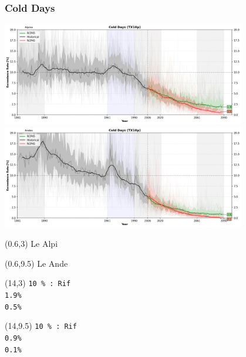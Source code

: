 \begin{frame}
\frametitle{Cold Days}
\begin{center}

{\includegraphics[width=0.8\textwidth]{risultati/tx10p_Alpine_Models_ts_lim_20}}
{\includegraphics[width=0.8\textwidth]{risultati/tx10p_Andes_Models_ts_lim_20}}
\end{center}

{
  \scriptsize
  \begin{textblock}{1.8}(0.6,3)
     {\color{gray} Le Alpi}
  \end{textblock}
}


{
  \scriptsize
  \begin{textblock}{1.8}(0.6,9.5)
     {\color{gray} Le Ande}
  \end{textblock}
}

{ \tiny
  \begin{textblock}{3}(14,3)
     {\color{CadetBlue}  \texttt{10 \% : Rif}} \\
     {\color{ForestGreen}\texttt{1.9\%}} \\
     {\color{red}        \texttt{0.5\%}}
  \end{textblock}
}

{ \tiny
  \begin{textblock}{3}(14,9.5)
     {\color{CadetBlue}   \texttt{10 \% : Rif}} \\
     {\color{ForestGreen}         \texttt{0.9\%}} \\
     {\color{red} \texttt{0.1\%}}
  \end{textblock}
}

\end{frame}



